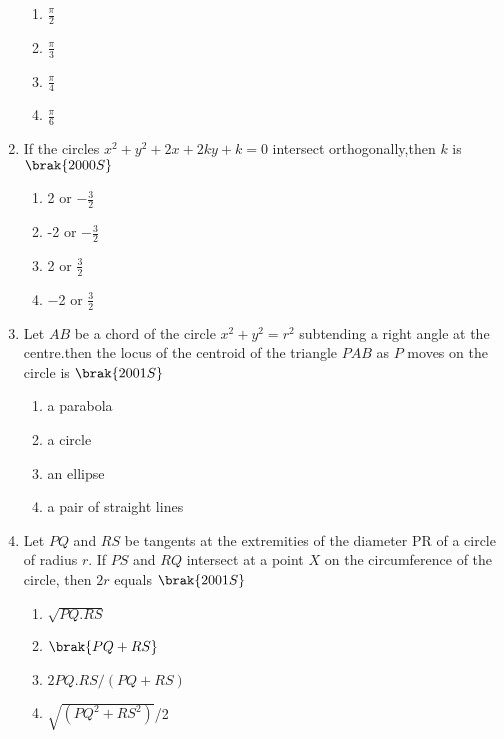 \begin{enumerate}
\begin{multicols}{2}
\begin{enumerate}
        \item $\frac{\pi}{2}$
        \item $\frac{\pi}{3}$
        \item $\frac{\pi}{4}$
        \item $\frac{\pi}{6}$
    \end{enumerate}
    \end{multicols}
     \item If the circles $x^2+y^2+2x+2ky+k=0$ intersect orthogonally,then $k$ is
        \hfill$\brak{2000S}$
    \begin{multicols}{2}
    \begin{enumerate}
        \item 2 or $-\frac{3}{2}$
        \item -2 or $-\frac{3}{2}$
        \item 2 or $\frac{3}{2}$
        \item $-$2 or $\frac{3}{2}$
    \end{enumerate}
    \end{multicols}
    \item Let $AB$ be a chord of the circle $x^2+y^2=r^2$ subtending a right angle at the centre.then the locus of the centroid of the triangle $PAB$  as $P$ moves on the circle is 
        \hfill$\brak{2001S}$
        \begin{multicols}{2}
    \begin{enumerate}
        \item a parabola
        \item a circle
        \item an ellipse
        \item a pair of straight lines
        \end{enumerate}
        \end{multicols}
        \item Let $PQ$ and $RS$ be tangents at the extremities of the diameter PR of a circle of radius $r$. If $PS$ and $RQ$ intersect at a point $X$ on the circumference of the circle, then $2r$ equals
        \hfill$\brak{2001S}$
        \begin{multicols}{2}
        \begin{enumerate}
    \item $\sqrt{PQ.RS}$
     \item $\brak{PQ+RS}$
    \item $2PQ.RS/(PQ+RS)$
     \item {$\sqrt{(PQ^2+RS^2)}$}/2
     \end{enumerate}

\end{multicols}
\end{enumerate}
